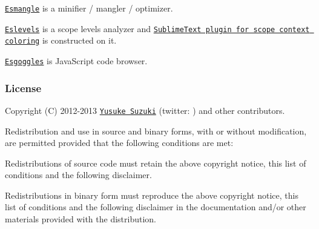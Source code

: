 \begin{DoxyItemize}
\item \href{https://github.com/estools/esmangle}{\tt Esmangle} is a minifier / mangler / optimizer.
\item \href{https://github.com/mazurov/eslevels}{\tt Eslevels} is a scope levels analyzer and \href{https://github.com/mazurov/sublime-levels}{\tt Sublime\+Text plugin for scope context coloring} is constructed on it.
\item \href{https://github.com/keeyipchan/esgoggles}{\tt Esgoggles} is Java\+Script code browser.
\end{DoxyItemize}

\subsubsection*{License}

Copyright (C) 2012-\/2013 \href{http://github.com/Constellation}{\tt Yusuke Suzuki} (twitter\+: \href{http://twitter.com/Constellation}{\tt }) and other contributors.

Redistribution and use in source and binary forms, with or without modification, are permitted provided that the following conditions are met\+:


\begin{DoxyItemize}
\item Redistributions of source code must retain the above copyright notice, this list of conditions and the following disclaimer.
\item Redistributions in binary form must reproduce the above copyright notice, this list of conditions and the following disclaimer in the documentation and/or other materials provided with the distribution.
\end{DoxyItemize}

